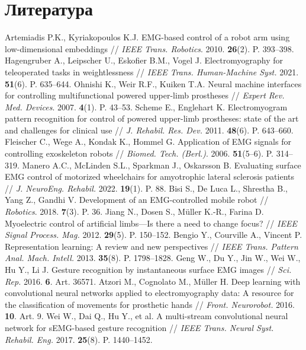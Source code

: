 \documentclass[12pt,a4paper]{article}
\begin{document}
\section*{Литература}
\begin{thebibliography}{99}
 Artemiadis P.K., Kyriakopoulos K.J. EMG-based control of a robot arm using low-dimensional embeddings // \textit{IEEE Trans. Robotics}. 2010. \textbf{26}(2). P. 393–398.
 Hagengruber A., Leipscher U., Eskofier B.M., Vogel J. Electromyography for teleoperated tasks in weightlessness // \textit{IEEE Trans. Human-Machine Syst.} 2021. \textbf{51}(6). P. 635–644.
 Ohnishi K., Weir R.F., Kuiken T.A. Neural machine interfaces for controlling multifunctional powered upper-limb prostheses // \textit{Expert Rev. Med. Devices}. 2007. \textbf{4}(1). P. 43–53.
 Scheme E., Englehart K. Electromyogram pattern recognition for control of powered upper-limb prostheses: state of the art and challenges for clinical use // \textit{J. Rehabil. Res. Dev.} 2011. \textbf{48}(6). P. 643–660.
 Fleischer C., Wege A., Kondak K., Hommel G. Application of EMG signals for controlling exoskeleton robots // \textit{Biomed. Tech. (Berl.)}. 2006. \textbf{51}(5–6). P. 314–319.
 Manero A.C., McLinden S.L., Sparkman J., Oskarsson B. Evaluating surface EMG control of motorized wheelchairs for amyotrophic lateral sclerosis patients // \textit{J. NeuroEng. Rehabil.} 2022. \textbf{19}(1). P. 88.
 Bisi S., De Luca L., Shrestha B., Yang Z., Gandhi V. Development of an EMG-controlled mobile robot // \textit{Robotics}. 2018. \textbf{7}(3). P. 36.
 Jiang N., Dosen S., Müller K.-R., Farina D. Myoelectric control of artificial limbs—Is there a need to change focus? // \textit{IEEE Signal Process. Mag.} 2012. \textbf{29}(5). P. 150–152.
 Bengio Y., Courville A., Vincent P. Representation learning: A review and new perspectives // \textit{IEEE Trans. Pattern Anal. Mach. Intell.} 2013. \textbf{35}(8). P. 1798–1828.
 Geng W., Du Y., Jin W., Wei W., Hu Y., Li J. Gesture recognition by instantaneous surface EMG images // \textit{Sci. Rep.} 2016. \textbf{6}. Art. 36571.
 Atzori M., Cognolato M., Müller H. Deep learning with convolutional neural networks applied to electromyography data: A resource for the classification of movements for prosthetic hands // \textit{Front. Neurorobot.} 2016. \textbf{10}. Art. 9.
 Wei W., Dai Q., Hu Y., et al. A multi-stream convolutional neural network for sEMG-based gesture recognition // \textit{IEEE Trans. Neural Syst. Rehabil. Eng.} 2017. \textbf{25}(8). P. 1440–1452.

\end{thebibliography}
\end{document}
